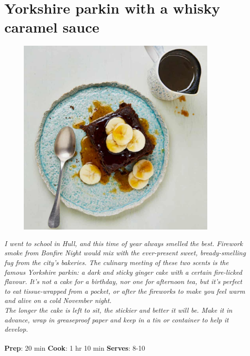 \documentclass{book}
\begin{document}
\section{Yorkshire parkin with a whisky caramel sauce}
\begin{figure}
\centering\includegraphics[width=10cm,height=10cm,keepaspectratio]{Recipe_Pictures/Yorkshire_parkin_with_a_whisky_caramel_sauce.png}
\end{figure}
\emph{I went to school in Hull, and this time of year always smelled the best. Firework smoke from Bonfire Night would mix with the ever-present sweet, bready-smelling fug from the city’s bakeries. The culinary meeting of these two scents is the famous Yorkshire parkin: a dark and sticky ginger cake with a certain fire-licked flavour. It’s not a cake for a birthday, nor one for afternoon tea, but it’s perfect to eat tissue-wrapped from a pocket, or after the fireworks to make you feel warm and alive on a cold November night.\\ 
The longer the cake is left to sit, the stickier and better it will be. Make it in advance, wrap in greaseproof paper and keep in a tin or container to help it develop.}\\\\ 
\textbf{Prep}: 20 min
\textbf{Cook}: 1 hr 10 min
\textbf{Serves}: 8-10
\end{document}
